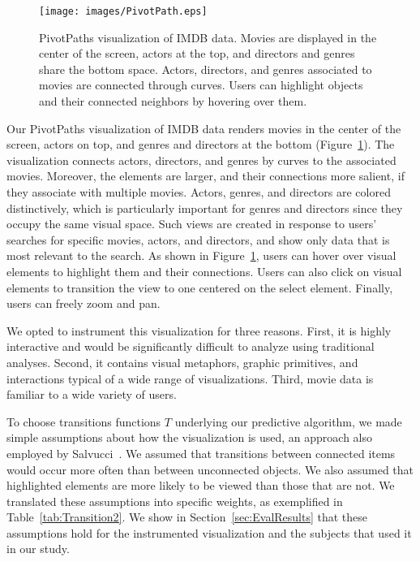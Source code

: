 \begin{figure}[htb]
  \centering
  \texttt{[image: images/PivotPath.eps]}
  \caption{PivotPaths visualization of IMDB data. Movies are displayed in the center of the screen, actors at the top, and directors and genres share the bottom space. Actors, directors, and genres associated to movies are connected through curves. Users can highlight objects and their connected neighbors by hovering over them.}
	\label{fig:pivotpaths}
\end{figure}
Our PivotPaths visualization of IMDB data renders movies in the center of the screen, actors on top, and genres and directors at the bottom (Figure~\ref{fig:pivotpaths}). The visualization connects actors, directors, and genres by curves to the associated movies. Moreover, the elements are larger, and their connections more salient, if they associate with multiple movies. Actors, genres, and directors are colored distinctively, which is particularly important for genres and directors since they occupy the same visual space. Such views are created in response to users' searches for specific movies, actors, and directors, and show only data that is most relevant to the search. As shown in Figure~\ref{fig:pivotpaths}, users can hover over visual elements to highlight them and their connections. Users can also click on visual elements to transition the view to one centered on the select element. Finally, users can freely zoom and pan. 

We opted to instrument this visualization for three reasons. First, it is highly interactive and would be significantly difficult to analyze using traditional analyses. Second, it contains visual metaphors, graphic primitives, and interactions typical of a wide range of visualizations. Third, movie data is familiar to a wide variety of users.  

To choose transitions functions $T$ underlying our predictive algorithm, we made simple assumptions about how the visualization is used, an approach also employed by Salvucci~\cite{Sal00}. We assumed that transitions between connected items would occur more often than between unconnected objects. We also assumed that highlighted elements are more likely to be viewed than those that are not. We translated these assumptions into specific weights, as exemplified in Table~\ref{tab:Transition2}. We show in Section~\ref{sec:EvalResults} that these assumptions hold for the instrumented visualization and the subjects that used it in our study. 

